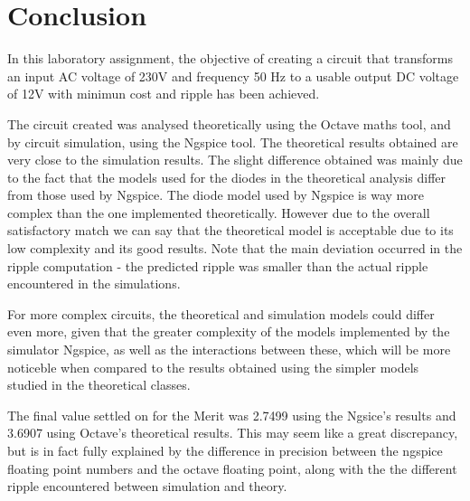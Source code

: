 \section{Conclusion}
\label{sec:conclusion}

In this laboratory assignment, the objective of creating a circuit that transforms an input AC voltage of 230V and frequency 50 Hz to a usable output DC voltage of 12V with minimun cost and ripple has been achieved.\par
The circuit created was analysed theoretically using the Octave maths tool, and by circuit simulation, using the
Ngspice tool. The theoretical results obtained are very close to the simulation results. The slight difference obtained was mainly due to the fact that the models used for the diodes in the theoretical analysis differ from those used by Ngspice. The diode model used by Ngspice is way more complex than the one implemented theoretically. However due to the overall satisfactory match we can say that the theoretical model is acceptable due to its low complexity and its good results. Note that the main deviation occurred in the ripple computation - the predicted ripple was smaller than the actual ripple encountered in the simulations.\par
 For more complex circuits, the
theoretical and simulation models could differ even more, given that the greater complexity of the models implemented by the simulator Ngspice, as well as the interactions between these, which will be more noticeble when compared to the results obtained using the simpler models studied in the theoretical classes.\par
The final value settled on for the Merit was 2.7499 using the Ngsice's results and 3.6907 using Octave's theoretical results. This may seem like a great discrepancy, but is in fact fully explained by the difference in precision between the ngspice floating point numbers and the octave floating point, along with the the different ripple encountered between simulation and theory.

